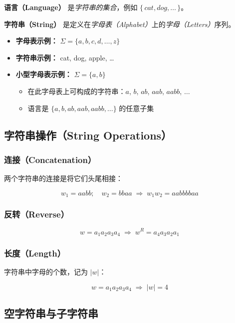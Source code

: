 \documentclass[12pt,a4paper]{ctexart}
\newcommand{\term}[1]{\textbf{\textcolor{mainblue}{#1}}}
\begin{document}
\begin{keybox}
  \term{语言（Language）} 是\emph{字符串的集合}，例如 $\{\, cat, dog, \dots \,\}$。

  \term{字符串（String）} 是定义在\emph{字母表（Alphabet）}上的\emph{字母（Letters）}序列。
\end{keybox}

\begin{itemize}[itemsep=0.2em]
  \item \textbf{字母表示例：} $\Sigma = \{a, b, c, d, \dots, z\}$
  \item \textbf{字符串示例：} cat, dog, apple, \dots
  \item \textbf{小型字母表示例：} $\Sigma = \{a, b\}$
  \begin{itemize}
    \item 在此字母表上可构成的字符串：$a$, $b$, $ab$, $aab$, $aabb$, $\dots$
    \item 语言是 $\{a, b, ab, aab, aabb, \dots\}$ 的任意子集
  \end{itemize}
\end{itemize}

\subsection{字符串操作（String Operations）}

\subsubsection{连接（Concatenation）}

两个字符串的连接是将它们头尾相接：

$$w_1 = aabb;\quad w_2 = bbaa \;\Longrightarrow\; w_1w_2 = aabbbbaa$$

\subsubsection{反转（Reverse）}

$$w = a_1a_2a_3a_4 \;\Longrightarrow\; w^R = a_4a_3a_2a_1$$

\subsubsection{长度（Length）}

字符串中字母的个数，记为 $|w|$：

$$w = a_1a_2a_3a_4 \;\Longrightarrow\; |w| = 4$$

\subsection{空字符串与子字符串}
\end{document}
